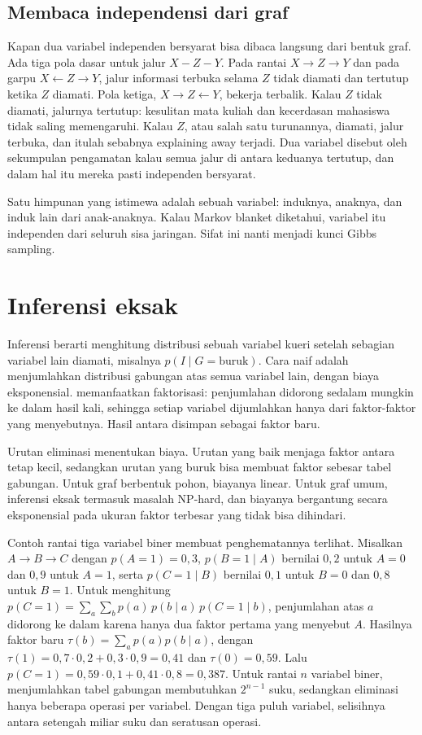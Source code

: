 \subsection{Membaca independensi dari graf}

Kapan dua variabel independen bersyarat bisa dibaca langsung dari bentuk graf. Ada tiga pola dasar
untuk jalur $X-Z-Y$. Pada rantai $X\to Z\to Y$ dan pada garpu $X\leftarrow Z\to Y$, jalur informasi
terbuka selama $Z$ tidak diamati dan tertutup ketika $Z$ diamati. Pola ketiga, 
$X\to Z\leftarrow Y$, bekerja terbalik. Kalau $Z$ tidak diamati, jalurnya tertutup: kesulitan mata
kuliah dan kecerdasan mahasiswa tidak saling memengaruhi. Kalau $Z$, atau salah satu turunannya,
diamati, jalur terbuka, dan itulah sebabnya explaining away terjadi. Dua variabel disebut
 oleh sekumpulan pengamatan kalau semua jalur di antara keduanya tertutup, dan
dalam hal itu mereka pasti independen bersyarat.

Satu himpunan yang istimewa adalah  sebuah variabel: induknya, anaknya, dan
induk lain dari anak-anaknya. Kalau Markov blanket diketahui, variabel itu independen dari seluruh
sisa jaringan. Sifat ini nanti menjadi kunci Gibbs sampling.

\section{Inferensi eksak}

Inferensi berarti menghitung distribusi sebuah variabel kueri setelah sebagian variabel lain
diamati, misalnya $p(I\mid G=\text{buruk})$. Cara naif adalah menjumlahkan distribusi gabungan
atas semua variabel lain, dengan biaya eksponensial.  memanfaatkan
faktorisasi: penjumlahan didorong sedalam mungkin ke dalam hasil kali, sehingga setiap variabel
dijumlahkan hanya dari faktor-faktor yang menyebutnya. Hasil antara disimpan sebagai faktor baru.

Urutan eliminasi menentukan biaya. Urutan yang baik menjaga faktor antara tetap kecil,
sedangkan urutan yang buruk bisa membuat faktor sebesar tabel gabungan. Untuk graf berbentuk
pohon, biayanya linear. Untuk graf umum, inferensi eksak termasuk masalah NP-hard, dan biayanya
bergantung secara eksponensial pada ukuran faktor terbesar yang tidak bisa dihindari.

Contoh rantai tiga variabel biner membuat penghematannya terlihat. Misalkan $A\to B\to C$ dengan $p(A{=}1)=0{,}3$,
$p(B{=}1\mid A)$ bernilai $0{,}2$ untuk $A=0$ dan $0{,}9$ untuk $A=1$, serta $p(C{=}1\mid B)$ bernilai $0{,}1$ untuk $B=0$ dan $0{,}8$ untuk
$B=1$. Untuk menghitung $p(C{=}1)=\sum_a\sum_bp(a)\,p(b\mid a)\,p(C{=}1\mid b)$, penjumlahan atas $a$ didorong ke dalam karena hanya dua
faktor pertama yang menyebut $A$. Hasilnya faktor baru $\tau(b)=\sum_ap(a)p(b\mid a)$, dengan
$\tau(1)=0{,}7\cdot0{,}2+0{,}3\cdot0{,}9=0{,}41$ dan $\tau(0)=0{,}59$. Lalu $p(C{=}1)=0{,}59\cdot0{,}1+0{,}41\cdot0{,}8=0{,}387$. Untuk rantai $n$
variabel biner, menjumlahkan tabel gabungan membutuhkan $2^{n-1}$ suku, sedangkan eliminasi hanya beberapa operasi per variabel. Dengan
tiga puluh variabel, selisihnya antara setengah miliar suku dan seratusan operasi.

